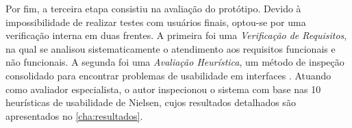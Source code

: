 Por fim, a terceira etapa consistiu na avaliação do protótipo. Devido à impossibilidade de realizar testes com usuários finais, optou-se por uma verificação interna em duas frentes. A primeira foi uma \textit{Verificação de Requisitos}, na qual se analisou sistematicamente o atendimento aos requisitos funcionais e não funcionais. A segunda foi uma \textit{Avaliação Heurística}, um método de inspeção consolidado para encontrar problemas de usabilidade em interfaces \cite{Nielsen1994}. Atuando como avaliador especialista, o autor inspecionou o sistema com base nas 10 heurísticas de usabilidade de Nielsen, cujos resultados detalhados são apresentados no \autoref{cha:resultados}.